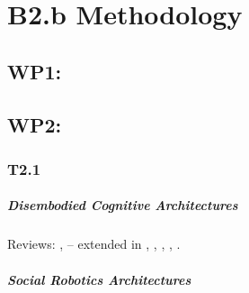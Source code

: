 \documentclass[11pt,a4paper]{report}
\newcommand{\eu}[1]{}
\begin{document}
\chapter{B2.b Methodology}\label{research-methodology}

\eu{Describe the proposed methodology in detail including any key intermediate
goals. Explain and justify the methodology in relation to the state of the art,
and particularly novel or unconventional aspects addressing the
'high-risk/high-gain' balance. Highlight any intermediate stages where results
may require adjustments to the project planning. In case you ask that team
members are engaged by another host institution their participation has to be
fully justified by the scientific added value they bring to the project.}

\section{WP1: \wpOne{}}



\section{WP2: \wpTwo{}}

\subsection{T2.1}

\paragraph{Disembodied Cognitive Architectures}

Reviews: \cite{chong2007integrated}, \cite{vernon2007survey} --
extended in \cite{kingdon2008review}, \cite{duch2008cognitive},
\cite{langley2009cognitive}, \cite{taatgen2010past},
\cite{thorisson2012cognitive}.


\paragraph{Social Robotics Architectures}\label{sec:robots}
\end{document}
